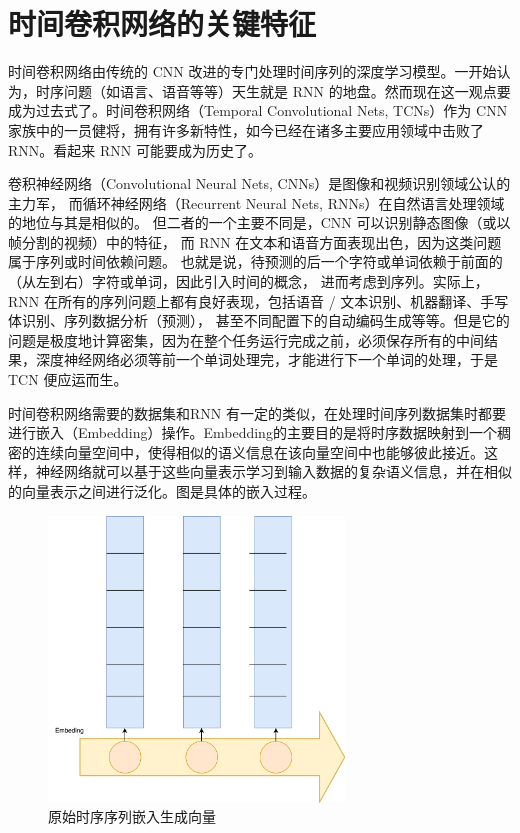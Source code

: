 \section{时间卷积网络的关键特征}
时间卷积网络由传统的 CNN 改进的专门处理时间序列的深度学习模型\cite{lea2016temporal}。一开始认为，时序问题（如语言、语音等等）天生就是 RNN 的地盘。然而现在这一观点要成为过去式了。时间卷积网络（Temporal Convolutional Nets, TCNs）作为 CNN 家族中的一员健将，拥有许多新特性，如今已经在诸多主要应用领域中击败了 RNN。看起来 RNN 可能要成为历史了。

卷积神经网络（Convolutional Neural Nets, CNNs）是图像和视频识别领域公认的主力军，
而循环神经网络（Recurrent Neural Nets, RNNs）在自然语言处理领域的地位与其是相似的。
但二者的一个主要不同是，CNN 可以识别静态图像（或以帧分割的视频）中的特征，
而 RNN 在文本和语音方面表现出色，因为这类问题属于序列或时间依赖问题。
也就是说，待预测的后一个字符或单词依赖于前面的（从左到右）字符或单词，因此引入时间的概念，
进而考虑到序列。实际上，RNN 在所有的序列问题上都有良好表现，包括语音 / 文本识别、机器翻译、手写体识别、序列数据分析（预测），
甚至不同配置下的自动编码生成等等。但是它的问题是极度地计算密集，因为在整个任务运行完成之前，必须保存所有的中间结果，深度神经网络必须等前一个单词处理完，才能进行下一个单词的处理，于是 TCN 便应运而生。

时间卷积网络需要的数据集和RNN 有一定的类似，在处理时间序列数据集时都要进行嵌入（Embedding）操作。Embedding的主要目的是将时序数据映射到一个稠密的连续向量空间中，使得相似的语义信息在该向量空间中也能够彼此接近。这样，神经网络就可以基于这些向量表示学习到输入数据的复杂语义信息，并在相似的向量表示之间进行泛化。图是具体的嵌入过程。

\begin{figure}[htbp]
  \centering
  \includegraphics[width=0.7\textwidth]{figures/embedding.png}
  \caption{原始时序序列嵌入生成向量}
\end{figure}

